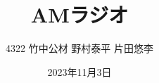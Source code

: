 \documentclass[11pt,dvipdfmx]{jarticle}
\begin{document}
\title{AMラジオ}
\author{4322 竹中公材  野村泰平  片田悠李}
\date{2023年11月3日}
\maketitle











\renewcommand{\refname}{参考文献}


\end{document}
